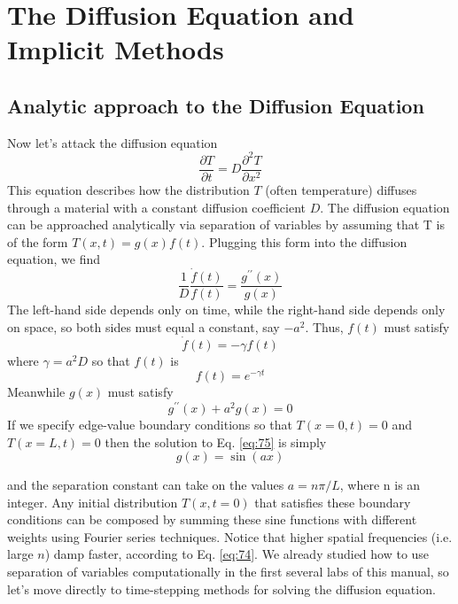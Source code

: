
\chapter*{The Diffusion Equation and Implicit Methods}
\section*{Analytic approach to the Diffusion Equation}

Now let\rq s attack the diffusion equation
\begin{equation}\label{eq:71}
\frac{\partial T}{\partial t}=D \frac{\partial^{2} T}{\partial x^{2}}
\end{equation}
This equation describes how the distribution $T$ (often temperature) diffuses
through a material with a constant diffusion coefficient $D$. The diffusion equation
can be approached analytically via separation of variables by assuming that T is
of the form $T(x,t) = g(x)f(t)$. Plugging this form into the diffusion equation, we
find
\begin{equation}\label{eq:72}
\frac{1}{D} \frac{\dot{f}(t)}{f(t)}=\frac{g^{\prime \prime}(x)}{g(x)}
\end{equation}
The left-hand side depends only on time, while the right-hand side depends only
on space, so both sides must equal a constant, say $-a^2$. Thus, $f (t)$ must satisfy
\begin{equation}\label{eq:73}
\dot{f}(t)=-\gamma f(t)
\end{equation}
where $ \gamma = a^2 D$ so that $f(t)$ is
\begin{equation}\label{eq:74}
f(t)=e^{-\gamma t}
\end{equation}
Meanwhile $g(x)$ must satisfy
\begin{equation}\label{eq:75}
g^{\prime \prime}(x)+a^{2} g(x)=0
\end{equation}
If we specify edge-value boundary conditions so that $T(x = 0,t) = 0$ and $T(x =
L,t) = 0$ then the solution to Eq. \ref{eq:75} is simply
\begin{equation}\label{eq:76}
g(x) = \sin(ax)
\end{equation}

and the separation constant can take on the values $a = n \pi /L$, where n is an integer.
Any initial distribution $T(x,t = 0)$ that satisfies these boundary conditions can be
composed by summing these sine functions with different weights using Fourier
series techniques. Notice that higher spatial frequencies (i.e. large $n$) damp faster,
according to Eq. \ref{eq:74}. We already studied how to use separation of variables
computationally in the first several labs of this manual, so let\rq s move directly to
time-stepping methods for solving the diffusion equation.

